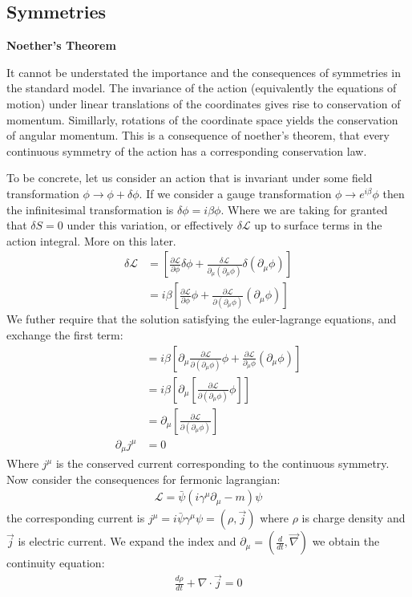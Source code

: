 \subsection{Symmetries}

\textbf{Noether's Theorem}

It cannot be understated the importance and the consequences of symmetries in the standard model. The
invariance of the action (equivalently the equations of motion) under linear translations of the  coordinates
gives rise to conservation of momentum. Simillarly,  rotations of the coordinate space
yields the conservation of angular momentum. This is a consequence of noether's theorem, that every 
continuous symmetry of the action has a corresponding conservation law. 

To be concrete, let us consider an action that is invariant under some field transformation
 $\phi \rightarrow \phi + \delta \phi$. If we consider a gauge transformation $\phi \rightarrow e^{i \beta}\phi$  
then the infinitesimal transformation is $\delta \phi = i \beta \phi$. Where we are taking for granted that $\delta S =0$ under
this variation, or effectively $\delta \mathcal{L}$ up to surface terms in the action integral. More on this later.
\begin{align*}
\delta \mathcal{L} &=  \left [ \frac{\partial \mathcal{L}}{\partial \phi} \delta \phi  + \frac{\delta \mathcal{L}}{\partial_\mu (\partial_\mu \phi)} \delta(\partial_\mu \phi) \right]\\
&= i\beta \left [ \frac{\partial \mathcal{L}}{\partial \phi}  \phi  + \frac{\partial \mathcal{L}}{\partial (\partial_\mu\phi)} (\partial_\mu \phi) \right]
\end{align*}
We futher require that the solution satisfying the euler-lagrange equations, and exchange the first term:
\begin{align*}
&= i\beta \left [ \partial_\mu \frac{\partial \mathcal{L}}{\partial(\partial_\mu \phi)}  \phi  + \frac{\partial \mathcal{L}}{\partial_\mu \phi} (\partial_\mu \phi) \right]\\ 
&= i\beta \left [ \partial_\mu  \left [  \frac{\partial \mathcal{L}}{\partial(\partial_\mu \phi)}   \phi  \right ] \right ]\\ 
&= \partial_\mu \left [ \frac{\partial \mathcal{L}}{\partial (\partial_\mu \phi) }\right ] \\
\partial_\mu j^\mu &= 0 
\end{align*}
Where $j^\mu$ is the conserved current corresponding to the continuous symmetry. Now consider the consequences for fermonic lagrangian:
\begin{align*}
\mathcal{L} = \bar{\psi}(i \gamma^\mu \partial_\mu -m)\psi
\end{align*}
the corresponding current is $j^\mu = i\bar \psi \gamma^\mu \psi = (\rho, \vec j)$ where $\rho$ is charge density and $\vec j$ is electric current.
We expand the index and $\partial_\mu = (\frac{d}{dt}, \vec \nabla)$ we obtain the continuity equation:
\begin{align*}
\frac{d\rho}{dt} + \nabla \cdot \vec j = 0
\end{align*}

